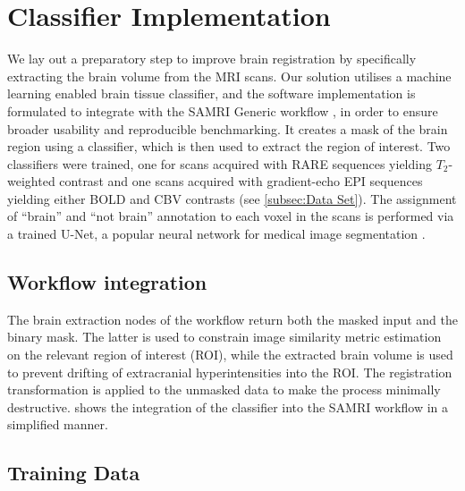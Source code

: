 \section{Classifier Implementation}
We lay out a preparatory step to improve brain registration by specifically extracting the brain volume from the MRI scans.
Our solution utilises a machine learning enabled brain tissue classifier, and the software implementation is formulated to integrate with the SAMRI Generic workflow \cite{ioanas_optimized_2019}, in order to ensure broader usability and reproducible benchmarking.
It creates a mask of the brain region using a classifier, which is then used to extract the region of interest.
Two classifiers were trained, one for scans acquired with RARE sequences yielding $T_2$-weighted contrast and one scans acquired with gradient-echo EPI sequences yielding either BOLD \cite{bold} and CBV \cite{cbv} contrasts (see \cref{subsec:Data Set}).
The assignment of “brain” and “not brain” annotation to each voxel in the scans is performed via a trained U-Net, a popular neural network for medical image segmentation \cite{ronneberger_u-net:_2015}.

\subsection{Workflow integration}
The brain extraction nodes of the workflow return both the masked input and the binary mask.
The latter is used to constrain image similarity metric estimation on the relevant region of interest (ROI), while the extracted brain volume is used to prevent drifting of extracranial hyperintensities into the ROI.
The registration transformation is applied to the unmasked data to make the process minimally destructive.
 shows the integration of the classifier into the SAMRI workflow in a simplified manner.

\subsection{Training Data}


